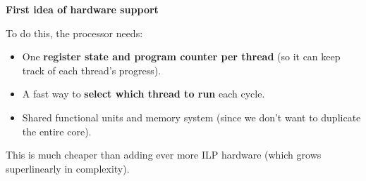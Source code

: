 \highspace
\begin{flushleft}
    \textcolor{Green3}{ \textbf{First idea of hardware support}}
\end{flushleft}
To do this, the processor needs:
\begin{itemize}
    \item One \textbf{register state and program counter per thread} (so it can keep track of each thread's progress).
    \item A fast way to \textbf{select which thread to run} each cycle.
    \item Shared functional units and memory system (since we don't want to duplicate the entire core).
\end{itemize}
This is much cheaper than adding ever more ILP hardware (which grows superlinearly in complexity).